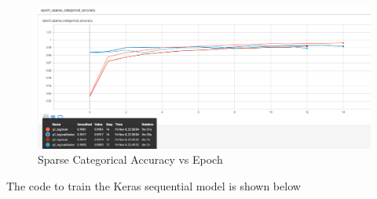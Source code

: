 \documentclass[11pt]{article}
\begin{document}
\begin{figure}[H]
\centering
\includegraphics[width=0.95\columnwidth]{pics/epoch_acc.png}
\captionsetup{justification=centering}
\caption{Sparse Categorical Accuracy vs Epoch}
\label{fig:data}
\end{figure}

The code to train the Keras sequential model is shown below
\end{document}
